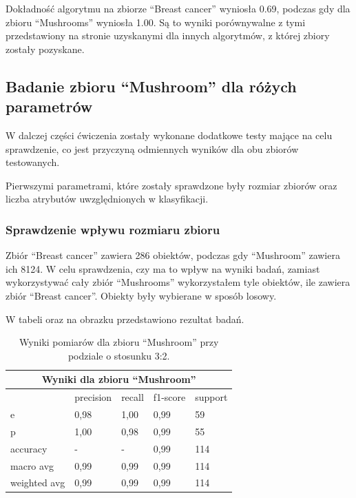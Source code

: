 \clearpage

Dokładność algorytmu na zbiorze ``Breast cancer'' wyniosła 0.69, podczas gdy
dla zbioru ``Mushrooms'' wyniosła 1.00. Są to wyniki porównywalne z tymi
przedstawiony na stronie uzyskanymi dla innych algorytmów, z której zbiory
zostały pozyskane.

\subsection{Badanie zbioru ``Mushroom'' dla różych parametrów}
W dalczej części ćwiczenia zostały wykonane dodatkowe testy mające na celu
sprawdzenie, co jest przyczyną odmiennych wyników dla obu zbiorów testowanych.


Pierwszymi parametrami, które zostały sprawdzone były rozmiar zbiorów oraz
liczba atrybutów uwzględnionych w klasyfikacji.
\subsubsection{Sprawdzenie wpływu rozmiaru zbioru}
Zbiór ``Breast cancer'' zawiera 286 obiektów, podczas gdy ``Mushroom'' zawiera
ich 8124. W celu sprawdzenia, czy ma to wpływ na wyniki badań, zamiast
wykorzystywać cały zbiór ``Mushrooms'' wykorzystałem tyle obiektów, ile zawiera
zbiór ``Breast cancer''. Obiekty były wybierane w sposób losowy.


W tabeli oraz na obrazku przedstawiono rezultat badań.

\begin{table}[h!]
        \centering
        \begin{tabular}{ |p{2cm}|p{2cm}|p{2cm}|p{2cm}|p{2cm}| }
                \hline
                \multicolumn{5}{|c|}{Wyniki dla zbioru ``Mushroom''} \\
                \hline
                 & precision & recall & f1-score & support \\
                \hline
                e & 0,98 & 1,00 & 0,99 & 59 \\
                \hline
                p & 1,00 & 0,98 & 0,99 & 55 \\
                \hline
                accuracy & - & - & 0,99 & 114 \\
                \hline
                macro avg & 0,99 & 0,99 & 0,99 & 114 \\
                \hline
                weighted avg & 0,99 & 0,99 & 0,99 & 114 \\
                \hline
        \end{tabular}
        \caption{Wyniki pomiarów dla zbioru ``Mushroom'' przy podziale o stosunku 3:2.}
\end{table}

